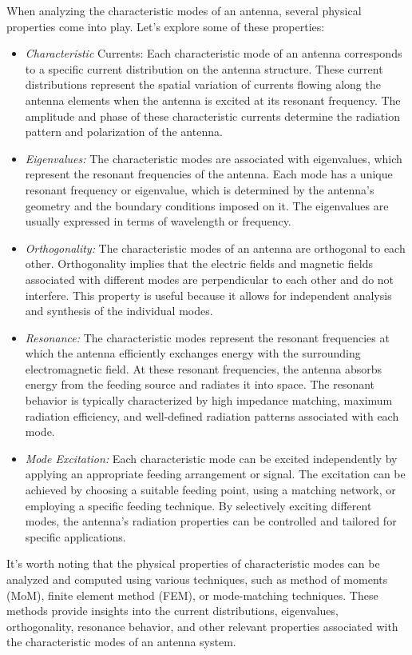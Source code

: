 \documentclass[11pt,a4paper]{article}
\begin{document}
When analyzing the characteristic modes of an antenna, several physical properties come into play. Let's explore some of these properties:
\begin{itemize}
    \item \emph{Characteristic }Currents: Each characteristic mode of an antenna corresponds to a specific current distribution on the antenna structure. These current distributions represent the spatial variation of currents flowing along the antenna elements when the antenna is excited at its resonant frequency. The amplitude and phase of these characteristic currents determine the radiation pattern and polarization of the antenna.
    \item \emph{Eigenvalues:} The characteristic modes are associated with eigenvalues, which represent the resonant frequencies of the antenna. Each mode has a unique resonant frequency or eigenvalue, which is determined by the antenna's geometry and the boundary conditions imposed on it. The eigenvalues are usually expressed in terms of wavelength or frequency.
    \item \emph{Orthogonality:} The characteristic modes of an antenna are orthogonal to each other. Orthogonality implies that the electric fields and magnetic fields associated with different modes are perpendicular to each other and do not interfere. This property is useful because it allows for independent analysis and synthesis of the individual modes.
    \item \emph{Resonance:} The characteristic modes represent the resonant frequencies at which the antenna efficiently exchanges energy with the surrounding electromagnetic field. At these resonant frequencies, the antenna absorbs energy from the feeding source and radiates it into space. The resonant behavior is typically characterized by high impedance matching, maximum radiation efficiency, and well-defined radiation patterns associated with each mode.
    \item \emph{Mode Excitation:} Each characteristic mode can be excited independently by applying an appropriate feeding arrangement or signal. The excitation can be achieved by choosing a suitable feeding point, using a matching network, or employing a specific feeding technique. By selectively exciting different modes, the antenna's radiation properties can be controlled and tailored for specific applications.
\end{itemize}
It's worth noting that the physical properties of characteristic modes can be analyzed and computed using various techniques, such as method of moments (MoM), finite element method (FEM), or mode-matching techniques. These methods provide insights into the current distributions, eigenvalues, orthogonality, resonance behavior, and other relevant properties associated with the characteristic modes of an antenna system.
\end{document}

